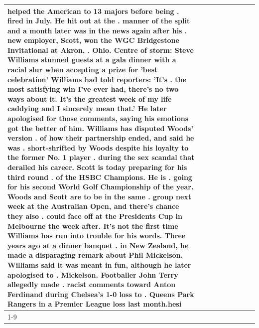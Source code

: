 \begin{table}[H]
\begin{tabular}{lllrlllll}
helped the American to 13 majors before being . fired in July. He hit out at the . manner of the split and a month later was in the news again after his . new employer, Scott, won the WGC Bridgestone Invitational at Akron, . Ohio. Centre of storm: Steve Williams stunned guests at a gala dinner with a racial slur when accepting a prize for 'best celebration' Williams had told reporters: 'It's . the most satisfying win I've ever had, there's no two ways about it. It's the greatest week of my life caddying and I sincerely mean that.' He later apologised for those comments, saying his emotions got the better of him. Williams has disputed Woods' version . of how their partnership ended, and said he was . short-shrifted by Woods despite his loyalty to the former No. 1 player . during the sex scandal that derailed his career. Scott is today preparing for his third round . of the HSBC Champions. He is . going for his second World Golf Championship of the year. Woods and Scott are to be in the same . group next week at the Australian Open, and there's chance they also . could face off at the Presidents Cup in Melbourne the week after. It's not the first time Williams has run into trouble for his words. Three years ago at a dinner banquet . in New Zealand, he made a disparaging remark about Phil Mickelson. Williams said it was meant in fun, although he later apologised to . Mickelson. Footballer John Terry allegedly made . racist comments toward Anton Ferdinand during Chelsea's 1-0 loss to . Queens Park Rangers in a Premier League loss last month.hesi \\
\cline{1-9}

\end{tabular}
\end{table}
